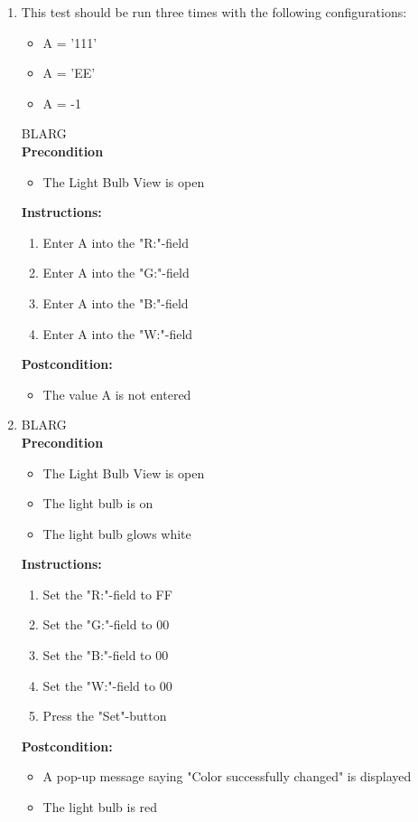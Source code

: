 \documentclass[a4paper]{article}
\newlength{\testlabellength}
\newenvironment{testlist}{\begin{enumerate}[label=\bfseries Instruction \thesubsection.\arabic* , labelindent=0pt, labelwidth=\testlabellength , leftmargin=2cm]}{\end{enumerate}}
\newenvironment{precondition}{
{\color{white}BLARG}\\ 
\textbf{Precondition}
\begin{itemize}[labelindent=0cm, labelwidth=2cm , leftmargin=1cm]
}
{\end{itemize}}
\newenvironment{instruction}{
\textbf{Instructions:}
\begin{enumerate}[label=\bfseries  \arabic*., labelindent=0cm, labelwidth=2cm , leftmargin=1cm]
}
{\end{enumerate}}
\newenvironment{postcondition}{
\textbf{Postcondition:}
\begin{itemize}[labelindent=0cm, labelwidth=2cm , leftmargin=1cm]
}
{\end{itemize}}
\begin{document}
\begin{appendices}
\begin{testlist}
	\item This test should be run three times with the following configurations:
		\begin{itemize}
			\item A = '111'
			\item A = 'EE'
			\item A = -1
		\end{itemize}
		\begin{precondition}
			\item The Light Bulb View is open
		\end{precondition}
		\begin{instruction}
			\item Enter A into the "R:"-field
			\item Enter A into the "G:"-field
			\item Enter A into the "B:"-field
			\item Enter A into the "W:"-field
		\end{instruction}
		\begin{postcondition}
			\item The value A is not entered
		\end{postcondition}

	\item
		\begin{precondition}
			\item The Light Bulb View is open
			\item The light bulb is on
			\item The light bulb glows white
		\end{precondition}
		\begin{instruction}
			\item Set the "R:"-field to FF
			\item Set the "G:"-field to 00
			\item Set the "B:"-field to 00
			\item Set the "W:"-field to 00
			\item Press the "Set"-button
		\end{instruction}
		\begin{postcondition}
			\item A pop-up message saying "Color successfully changed" is displayed
			\item The light bulb is red
		\end{postcondition}


\end{testlist}
\end{appendices}
\end{document}
